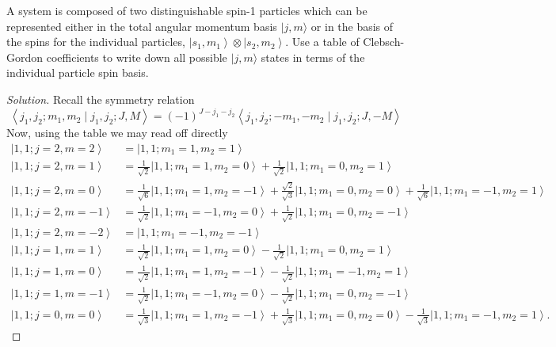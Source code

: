 
\begin{problem}
	A system is composed of two distinguishable spin-1 particles which can be represented either in the total angular momentum basis $|j, m\rangle$ or in the basis of the spins for the individual particles, $\left|s_1, m_1\right\rangle \otimes\left|s_2, m_2\right\rangle$. Use a table of Clebsch-Gordon coefficients to write down all possible $|j, m\rangle$ states in terms of the individual particle spin basis.
\end{problem}
\begin{proof}[Solution]
	Recall the symmetry relation
	\[
		\left\langle j_1, j_2 ; m_1, m_2 \mid j_1, j_2 ; J, M\right\rangle=(-1)^{J-j_1-j_2}\left\langle j_1, j_2 ;-m_1,-m_2 \mid j_1, j_2 ; J,-M\right\rangle
	\]
	Now, using the table we may read off directly
	\begin{align*}
		\left| 1, 1 ; j = 2, m = 2 \right\rangle &= \left| 1, 1; m_1=1, m_2=1 \right\rangle  \\
		\left| 1, 1 ; j = 2, m = 1 \right\rangle &= \frac{1}{\sqrt{2} }\left| 1, 1; m_1=1, m_2=0 \right\rangle + \frac{1}{\sqrt{2} } \left| 1,1; m_1=0, m_2=1 \right\rangle   \\
		\left| 1, 1 ; j = 2, m =0 \right\rangle &= \frac{1}{\sqrt{6} }\left| 1, 1; m_1=1, m_2=-1 \right\rangle + \frac{\sqrt{2} }{\sqrt{3} } \left| 1,1; m_1=0, m_2=0 \right\rangle + \frac{1}{\sqrt{6} } \left| 1,1; m_1=-1, m_2=1 \right\rangle    \\
		\left| 1, 1 ; j = 2, m = -1 \right\rangle &= \frac{1}{\sqrt{2} }\left| 1, 1; m_1=-1, m_2=0 \right\rangle + \frac{1}{\sqrt{2} } \left| 1,1; m_1=0, m_2=-1 \right\rangle \\
\left| 1, 1 ; j = 2, m = -2 \right\rangle &= \left| 1, 1; m_1=-1, m_2=-1 \right\rangle \\
\left| 1, 1 ; j = 1, m = 1 \right\rangle &= \frac{1}{\sqrt{2} }\left| 1, 1; m_1=1, m_2=0 \right\rangle - \frac{1}{\sqrt{2} } \left| 1,1; m_1=0, m_2=1 \right\rangle \\
\left| 1, 1 ; j = 1, m = 0 \right\rangle &= \frac{1}{\sqrt{2} }\left| 1, 1; m_1=1, m_2=-1 \right\rangle - \frac{1}{\sqrt{2} } \left| 1,1; m_1=-1, m_2=1 \right\rangle\\
\left| 1, 1 ; j = 1, m = -1 \right\rangle &= \frac{1}{\sqrt{2} }\left| 1, 1; m_1=-1, m_2=0 \right\rangle - \frac{1}{\sqrt{2} } \left| 1,1; m_1=0, m_2=-1 \right\rangle \\
\left| 1, 1 ; j = 0, m = 0 \right\rangle &= \frac{1}{\sqrt{3} }\left| 1, 1; m_1=1, m_2=-1 \right\rangle + \frac{1}{\sqrt{3} } \left| 1,1; m_1=0, m_2=0 \right\rangle - \frac{1}{\sqrt{3} } \left| 1,1; m_1=-1, m_2=1 \right\rangle
	.\end{align*}
\end{proof}

